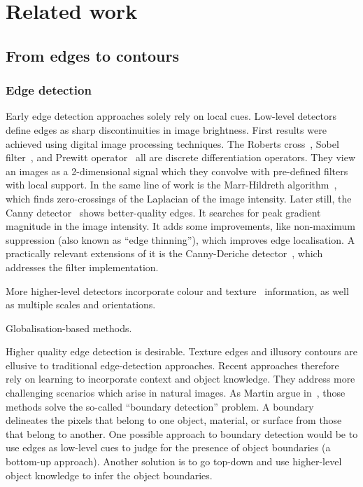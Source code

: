 \section{Related work}
\subsection{From edges to contours}
\subsubsection{Edge detection}
Early edge detection approaches solely rely on local cues. Low-level detectors define edges as sharp discontinuities in image brightness. First results were achieved using digital image processing techniques. The Roberts cross~\cite{roberts1963machine}, Sobel filter~\cite{sobel19683x3}, and Prewitt operator~\cite{prewitt1970object} all are discrete differentiation operators. %
They view an images as a 2-dimensional signal which they convolve with pre-defined filters with local support. In the same line of work is the Marr-Hildreth algorithm~\cite{marr1980theory}, which finds zero-crossings of the Laplacian of the image intensity. Later still, the Canny detector~\cite{canny1986computational} shows better-quality edges. It searches for peak gradient magnitude in the image intensity. It adds some improvements, like non-maximum suppression (also known as ``edge thinning''), which improves edge localisation. A practically relevant extensions of it is the Canny-Deriche detector~\cite{deriche1987using}, which addresses the filter implementation.

More higher-level detectors incorporate colour and texture~\cite{rubner1996coalescing,will2000learning} information, as well as multiple scales and orientations.

Globalisation-based methods.

Higher quality edge detection is desirable. Texture edges and illusory contours are ellusive to %
traditional edge-detection approaches. Recent approaches therefore rely on learning to incorporate context and object knowledge. They address more challenging scenarios which arise in natural images. As Martin \etal argue in~\cite{martin2004learning}, those methods solve the so-called ``boundary detection'' problem. A boundary delineates the pixels that belong to one object, material, or surface from those that belong to another. One possible approach to boundary detection would be to use edges as low-level cues to judge for the presence of object boundaries (a bottom-up approach). Another solution is to go top-down and use higher-level object knowledge to infer the object boundaries.

